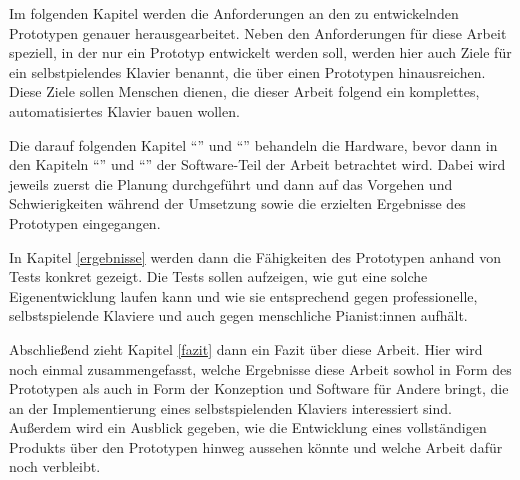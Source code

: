 Im folgenden Kapitel werden die Anforderungen an den zu entwickelnden Prototypen genauer herausgearbeitet.
Neben den Anforderungen für diese Arbeit speziell, in der nur ein Prototyp entwickelt werden soll, werden hier auch Ziele für ein selbstpielendes Klavier benannt, die über einen Prototypen hinausreichen.
Diese Ziele sollen Menschen dienen, die dieser Arbeit folgend ein komplettes, automatisiertes Klavier bauen wollen.

Die darauf folgenden Kapitel \enquote{} und \enquote{} behandeln die Hardware, bevor dann in den Kapiteln \enquote{} und \enquote{} der Software-Teil der Arbeit betrachtet wird.
Dabei wird jeweils zuerst die Planung durchgeführt und dann auf das Vorgehen und Schwierigkeiten während der Umsetzung sowie die erzielten Ergebnisse des Prototypen eingegangen.

In Kapitel \ref{ergebnisse} werden dann die Fähigkeiten des Prototypen anhand von Tests konkret gezeigt.
Die Tests sollen aufzeigen, wie gut eine solche Eigenentwicklung laufen kann und wie sie entsprechend gegen professionelle, selbstspielende Klaviere und auch gegen menschliche Pianist:innen aufhält. %

Abschließend zieht Kapitel \ref{fazit} dann ein Fazit über diese Arbeit.
Hier wird noch einmal zusammengefasst, welche Ergebnisse diese Arbeit sowhol in Form des Prototypen als auch in Form der Konzeption und Software für Andere bringt, die an der Implementierung eines selbstspielenden Klaviers interessiert sind.
Außerdem wird ein Ausblick gegeben, wie die Entwicklung eines vollständigen Produkts über den Prototypen hinweg aussehen könnte und welche Arbeit dafür noch verbleibt.
